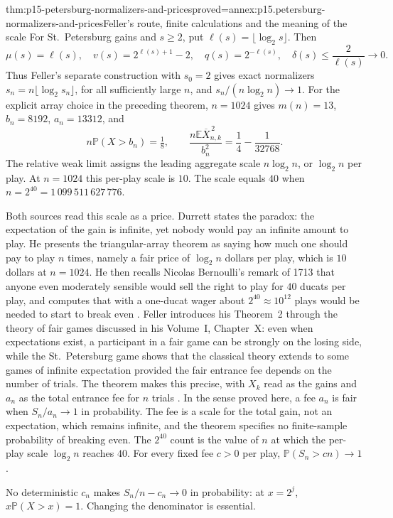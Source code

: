 \begin{hbtheorem}{thm:p15-petersburg-normalizers-and-prices}{proved=annex:p15.petersburg-normalizers-and-prices}{Feller's route, finite calculations and the meaning of the scale}
For St.~Petersburg gains and \(s\geq2\), put
\(\ell(s)=\lfloor\log_2s\rfloor\). Then
\[
 \mu(s)=\ell(s),\quad
 v(s)=2^{\ell(s)+1}-2,\quad
 q(s)=2^{-\ell(s)},\quad
 \delta(s)\leq\frac{2}{\ell(s)}\longrightarrow0.
\]
Thus Feller's separate construction with \(s_0=2\) gives exact
normalizers \(s_n=n\lfloor\log_2s_n\rfloor\), for all sufficiently
large \(n\), and \(s_n/(n\log_2n)\to1\).
For the explicit array choice in the preceding theorem, \(n=1024\)
gives \(m(n)=13\), \(b_n=8192\), \(a_n=13312\), and
\[
 n\mathbb P(X>b_n)=\tfrac18,\qquad
 \frac{n\mathbb E\overline X_{n,k}^{\,2}}{b_n^2}
                   =\frac14-\frac1{32768}.
\]
The relative weak limit assigns the leading aggregate scale
\(n\log_2n\), or \(\log_2n\) per play. At \(n=1024\) this
per-play scale is \(10\). The scale equals \(40\) when
\(n=2^{40}=1\,099\,511\,627\,776\).

Both sources read this scale as a price. Durrett states the paradox:
the expectation of the gain is infinite, yet nobody would pay an
infinite amount to play. He presents the triangular-array theorem as
saying how much one should pay to play \(n\) times, namely a fair price
of \(\log_2n\) dollars per play, which is \(10\) dollars at
\(n=1024\). He then recalls Nicolas Bernoulli's remark of 1713 that
anyone even moderately sensible would sell the right to play for
\(40\) ducats per play, and computes that with a one-ducat wager about
\(2^{40}\approx10^{12}\) plays would be needed to start to break even
\cite[pp.~65--66]{DurrettPTEAuthor2019}. Feller introduces his
Theorem~2 through the theory of fair games discussed in his Volume~I,
Chapter~X: even when expectations exist, a participant in a fair game
can be strongly on the losing side, while the St.~Petersburg game shows
that the classical theory extends to some games of infinite expectation
provided the fair entrance fee depends on the number of trials. The
theorem makes this precise, with \(X_k\) read as the gains and \(a_n\)
as the total entrance fee for \(n\) trials
\cite[p.~236]{Feller1971ProbabilityII}.
In the sense proved here, a fee \(a_n\) is fair when
\(S_n/a_n\to1\) in probability. The fee is a scale for the total gain,
not an expectation, which remains infinite, and the theorem specifies
no finite-sample probability of breaking even. The \(2^{40}\) count is
the value of \(n\) at which the per-play scale \(\log_2n\) reaches
\(40\). For every fixed fee \(c>0\) per play,
\(\mathbb P(S_n>cn)\to1\).

No deterministic \(c_n\) makes \(S_n/n-c_n\to0\) in probability:
at \(x=2^j\), \(x\mathbb P(X>x)=1\).
Changing the denominator is essential.
\end{hbtheorem}

